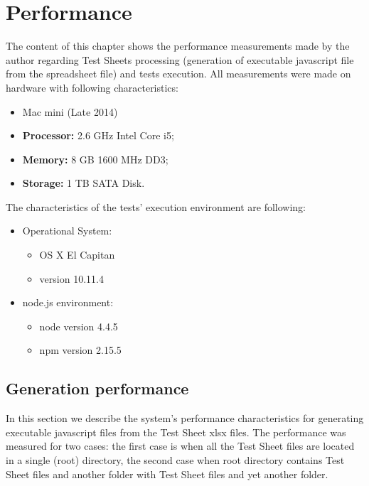 \chapter{Performance}
\label{chap:perfux}
The content of this chapter shows the performance measurements made by the author regarding Test Sheets processing (generation of executable javascript file from the spreadsheet file) and tests execution.  
All measurements were made on hardware with following characteristics:
\begin{itemize}
	\item Mac mini (Late 2014)
	\item \textbf{Processor:} 2.6 GHz Intel Core i5;
	\item \textbf{Memory:} 8 GB 1600 MHz DD3;
	\item \textbf{Storage:}  1 TB SATA Disk.
\end{itemize}

The characteristics of the tests' execution environment are following:
\begin{itemize}
\item Operational System:
\begin{itemize}
	\item OS X El Capitan
	\item version 10.11.4
\end{itemize}

\item node.js environment:
\begin{itemize}
	\item node version 4.4.5
	\item npm version 2.15.5
\end{itemize}
\end{itemize}


\section{Generation performance}
In this section we describe the system's performance characteristics for generating executable javascript files from the Test Sheet xlsx files. The performance was measured for two cases: the first case is when all the Test Sheet files are located in a single (root) directory, the second case when root directory contains Test Sheet files and another folder with Test Sheet files and yet another folder.
